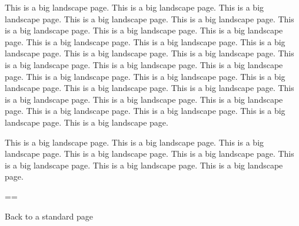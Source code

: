 \documentclass{article}
\begin{document}
\clearpage
\edef\hmm{\pdfpagewidth=\the\pdfpagewidth \pdfpageheight=\the\pdfpageheight\relax}
\pdfpagewidth=17in
\pdfpageheight=11in

This is a big landscape page. This is a big landscape page. This is a big landscape page. This is a big landscape page. 
This is a big landscape page. This is a big landscape page. This is a big landscape page. This is a big landscape page. 
This is a big landscape page. This is a big landscape page. This is a big landscape page. This is a big landscape page. 
This is a big landscape page. This is a big landscape page. This is a big landscape page. This is a big landscape page. 
This is a big landscape page. This is a big landscape page. This is a big landscape page. This is a big landscape page. 
This is a big landscape page. This is a big landscape page. This is a big landscape page. This is a big landscape page. 
This is a big landscape page. This is a big landscape page. This is a big landscape page. This is a big landscape page.

\vspace*{\fill}

This is a big landscape page. This is a big landscape page. This is a big landscape page. This is a big landscape page. 
This is a big landscape page. This is a big landscape page. This is a big landscape page. This is a big landscape page. 
 
\restoregeometry
\hmm

Back to a standard page
\end{document}
